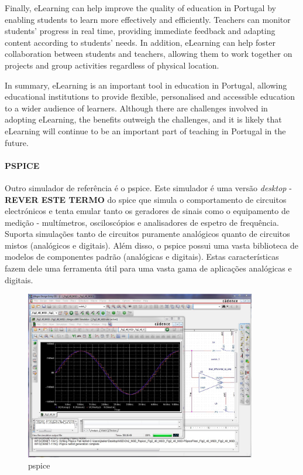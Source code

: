 Finally, eLearning can help improve the quality of education in Portugal by enabling students to learn more effectively and efficiently. Teachers can monitor students' progress in real time, providing immediate feedback and adapting content according to students' needs. In addition, eLearning can help foster collaboration between students and teachers, allowing them to work together on projects and group activities regardless of physical location.

In summary, eLearning is an important tool in education in Portugal, allowing educational institutions to provide flexible, personalised and accessible education to a wider audience of learners. Although there are challenges involved in adopting eLearning, the benefits outweigh the challenges, and it is likely that eLearning will continue to be an important part of teaching in Portugal in the future.


\paragraph{PSPICE}
Outro simulador de referência é o \acrfull{pspice}. Este simulador é uma versão \textit{desktop} - \textbf{REVER ESTE TERMO} do \acrshort{spice} que simula o comportamento de circuitos electrónicos e tenta emular tanto os geradores de sinais como o equipamento de medição - multímetros, osciloscópios e analisadores de espetro de frequência. Suporta simulações tanto de circuitos puramente analógicos quanto de circuitos mistos (analógicos e digitais). Além disso, o \acrshort{pspice} possui uma vasta biblioteca de modelos de componentes padrão (analógicas e digitais). Estas características fazem dele uma ferramenta útil para uma vasta gama de aplicações analógicas e digitais\cite{PSpiceSystemSimulation, AboutPSp93:online}. 

\begin{figure}[hbtp]
    \centering
    \includegraphics[width=0.9\textwidth]{figures/pspice.jpg}
    \caption{\acrshort{pspice}}
    \label{fig:pspice}
\end{figure}

